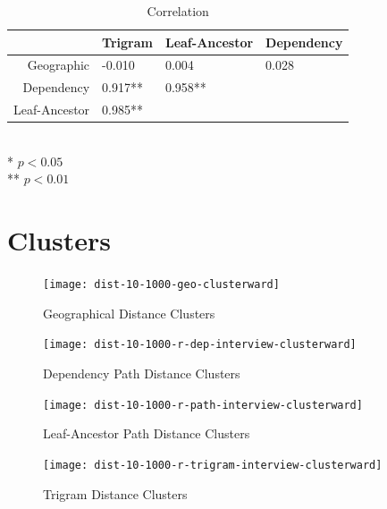 \begin{table}
\begin{tabular}{r|lll}
  & Trigram & Leaf-Ancestor & Dependency  \\ \hline
  Geographic & -0.010 & 0.004 & 0.028 \\
  Dependency & 0.917** & 0.958** & \\
  Leaf-Ancestor & 0.985** & & \\
\end{tabular} \\
* $ p < 0.05$ \\
** $ p < 0.01$ \\
\label{correlation}
\caption{Correlation}
\end{table}

\section{Clusters}
\begin{figure}
  \texttt{[image: dist-10-1000-geo-clusterward]} %
  \label{geo-dist-cluster}
  \caption{Geographical Distance Clusters}
\end{figure}
\begin{figure}
  \texttt{[image: dist-10-1000-r-dep-interview-clusterward]} %
  \label{dep-dist-cluster}
  \caption{Dependency Path Distance Clusters}
\end{figure}
\begin{figure}
  \texttt{[image: dist-10-1000-r-path-interview-clusterward]} %
  \label{path-dist-cluster}
  \caption{Leaf-Ancestor Path Distance Clusters}
\end{figure}
\begin{figure}
  \texttt{[image: dist-10-1000-r-trigram-interview-clusterward]} %
  \label{trigram-dist-cluster}
  \caption{Trigram Distance Clusters}
\end{figure}
